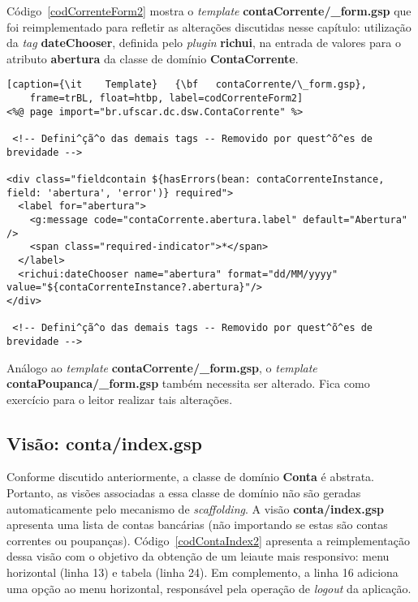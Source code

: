 \vspace{0.3cm}

\noindent   Código~\ref{codCorrenteForm2}   mostra   o   {\it   template}   {\bf
  contaCorrente/\_form.gsp} que  foi reimplementado para  refletir as alterações
discutidas nesse  capítulo: utilização da {\it tag}  {\bf dateChooser}, definida
pelo  {\it plugin}  {\bf richui},  na entrada  de valores  para o  atributo {\bf
  abertura} da classe de domínio {\bf ContaCorrente}.  

\vspace{0.3cm}

\begin{lstlisting}[caption={\it    Template}   {\bf   contaCorrente/\_form.gsp},
    frame=trBL, float=htbp, label=codCorrenteForm2] 
<%@ page import="br.ufscar.dc.dsw.ContaCorrente" %>

 <!-- Defini^çã^o das demais tags -- Removido por quest^õ^es de brevidade -->

<div class="fieldcontain ${hasErrors(bean: contaCorrenteInstance, field: 'abertura', 'error')} required">
  <label for="abertura">
    <g:message code="contaCorrente.abertura.label" default="Abertura" />
    <span class="required-indicator">*</span>
  </label>
  <richui:dateChooser name="abertura" format="dd/MM/yyyy" value="${contaCorrenteInstance?.abertura}"/>
</div>

 <!-- Defini^çã^o das demais tags -- Removido por quest^õ^es de brevidade -->

\end{lstlisting}

\begin{remark}
Análogo ao {\it template}  {\bf contaCorrente/\_form.gsp}, o {\it template} {\bf
  contaPoupanca/\_form.gsp} também necessita  ser alterado.  Fica como exercício
para o leitor realizar tais alterações.  
\end{remark}

\newpage

\subsection{Visão: conta/index.gsp}

\vspace{0.5cm}

Conforme discutido  anteriormente, a classe  de domínio {\bf Conta}  é abstrata.
Portanto,  as  visões  associadas a  essa  classe  de  domínio não  são  geradas
automaticamente   pelo   mecanismo   de   {\it  scaffolding}.   A   visão   {\bf
  conta/index.gsp} apresenta  uma lista de  contas bancárias (não  importando se
estas são contas correntes ou poupanças).  Código~\ref{codContaIndex2} apresenta
a reimplementação  dessa visão  com o  objetivo da obtenção  de um  leiaute mais
responsivo: menu horizontal  (linha 13) e tabela (linha  24).  Em complemento, a
linha 16  adiciona uma  opção ao menu  horizontal, responsável pela  operação de
{\it logout} da aplicação.  

